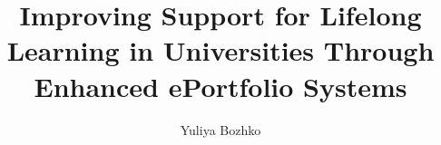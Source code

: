 \documentclass[11pt,PhD,twoside,openright]{muthesis}
\begin{document}



\title{Improving Support for Lifelong Learning in Universities Through Enhanced
ePortfolio Systems}
\author{Yuliya Bozhko}

\beforeabstract



\newpage
\cleardoublepage
 
 

\newpage
\cleardoublepage

 

\newpage
\cleardoublepage

 

\newpage
\cleardoublepage
 
\begin{spacing}{0.9}
\tableofcontents
\listoffigures
\listoftables
\end{spacing}

\newpage
\cleardoublepage

\afterpreface

\pagestyle{fancy}

\fancyhead{}
\fancyhead[LE,LO]{\slshape \leftmark}

\fancyfoot{} 
\fancyfoot[LE,RO]{\thepage} 
\renewcommand{\headrulewidth}{0.4pt}
\renewcommand{\footrulewidth}{0pt}


 


 
 
 
 
 

\cleardoublepage
{} 
{}
             

\appendix







\end{document}
